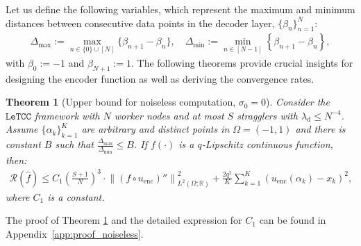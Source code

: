 \documentclass{article}
\newtheorem{theorem}{Theorem}
\def\encs{u_\textrm{enc}}
\def\declamb{\lambda_\textrm{d}}
\def\nprcc{\texttt{LeTCC}}
\newcommand{\norm}[1]{\left\lVert#1\right\rVert}
\newcommand{\lp}[1]{{L}^{#1}\left(\Omega; \mathbb{R}\right)}
\begin{document}
Let us define the following variables, which represent the maximum and minimum distances between consecutive data points in the decoder layer, $\{\beta_n\}_{n=1}^N$:
\begin{gather}\label{eq:max_dist_st}
\Delta_\textrm{max}:=\underset{n\in \{0\} \cup [N]}{\max} \{\beta_{n+1}-\beta_n\}, \quad \Delta_\textrm{min}:=\underset{n\in [N-1]}{\min} \left\{\beta_{n+1}-\beta_n\right\},
\end{gather}
with $\beta_{0} := -1$ and $\beta_{N+1} := 1$. The following theorems provide crucial insights for designing the encoder function as well as deriving the convergence rates.
\begin{theorem}[Upper bound for noiseless computation,   $\sigma_0 = 0$] \label{th:conv_rate_noiseless}
Consider the $\nprcc$ framework with $N$ worker nodes and at most $S$ stragglers with $\declamb \leqslant N^{-4}$. Assume $\{\alpha_k\}^K_{k=1}$ are arbitrary and distinct points in $\Omega=(-1, 1)$ and there is  constant $B$ such that $\frac{\Delta_{\textrm{max}}}{\Delta_{\textrm{min}}} \leqslant B$. If $f(\cdot)$ is a $q$-Lipschitz continuous function, then:
\begin{align}\label{eq:th2}
    \mathcal{R}(\hat{f}) \leqslant C_1\left(\frac{S+1}{N}\right)^3  \cdot \norm{(f \circ \encs)''}^2_{\lp{2}} + \frac{2q^2}{K} \sum^K_{k=1} (\encs(\alpha_k) - x_k)^2 ,
\end{align}
where $C_1$ is a constant. 
\end{theorem}
The proof of Theorem \ref{th:conv_rate_noiseless} and the detailed expression for $C_1$ can be found in Appendix~\ref{app:proof_noiseless}.
\end{document}
